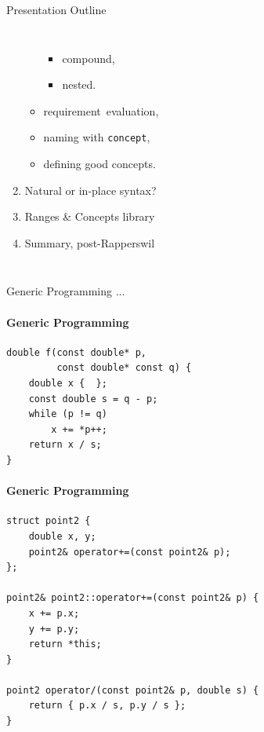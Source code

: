 \documentclass{beamer}
\begin{document}
\begin{frame}[fragile]{Presentation Outline}
\begin{columns}
\begin{enumerate}
\begin{itemize}
\begin{itemize}
                        \item compound,
                        \item nested.
                    \end{itemize}
                    \item requirement\, evaluation,
                    \item naming with \texttt{concept},
                    \item defining good concepts.
                \end{itemize}
                \item Natural or in-place syntax?
                \item Ranges \& Concepts library
                \item Summary, post-Rapperswil
            \end{enumerate}
        \end{columns}
    \end{frame}

    \begin{frame}[fragile]{Generic Programming}
        ...
    \end{frame}

    \begin{frame}[fragile]{}
        \framesubtitle{Generic Programming}
        \begin{center}
        \begin{lstlisting}[caption={a ``mysterious'' function; can you figure out what this code is?}]
double f(const double* p,
         const double* const q) {
    double x {  };
    const double s = q - p;
    while (p != q)
        x += *p++;
    return x / s;
} \end{lstlisting}
        \end{center}
    \end{frame}

    \begin{frame}[fragile]{}
        \framesubtitle{Generic Programming}
        \begin{center}
        \begin{lstlisting}[caption={boilerplate for the next example; a very incomplete point class.}]
struct point2 {
    double x, y;
    point2& operator+=(const point2& p);
};

point2& point2::operator+=(const point2& p) {
    x += p.x;
    y += p.y;
    return *this;
}

point2 operator/(const point2& p, double s) {
    return { p.x / s, p.y / s };
} \end{lstlisting}
        \end{center}
    \end{frame}
\end{document}
